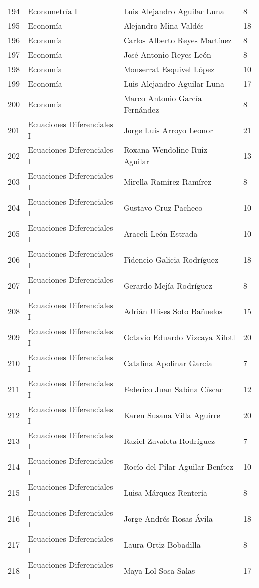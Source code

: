 \begin{table}[ht]
\begin{tabular}{rlll}
  194 & Econometría I & Luis Alejandro Aguilar Luna & 8 \\ 
  195 & Economía & Alejandro Mina Valdés & 18 \\ 
  196 & Economía & Carlos Alberto Reyes Martínez & 8 \\ 
  197 & Economía & José Antonio Reyes León & 8 \\ 
  198 & Economía & Monserrat Esquivel López & 10 \\ 
  199 & Economía & Luis Alejandro Aguilar Luna & 17 \\ 
  200 & Economía & Marco Antonio García Fernández & 8 \\ 
  201 & Ecuaciones Diferenciales I & Jorge Luis Arroyo Leonor & 21 \\ 
  202 & Ecuaciones Diferenciales I & Roxana Wendoline Ruiz Aguilar & 13 \\ 
  203 & Ecuaciones Diferenciales I & Mirella Ramírez Ramírez & 8 \\ 
  204 & Ecuaciones Diferenciales I & Gustavo Cruz Pacheco & 10 \\ 
  205 & Ecuaciones Diferenciales I & Araceli León Estrada & 10 \\ 
  206 & Ecuaciones Diferenciales I & Fidencio Galicia Rodríguez & 18 \\ 
  207 & Ecuaciones Diferenciales I & Gerardo Mejía Rodríguez & 8 \\ 
  208 & Ecuaciones Diferenciales I & Adrián Ulises Soto Bañuelos & 15 \\ 
  209 & Ecuaciones Diferenciales I & Octavio Eduardo Vizcaya Xilotl & 20 \\ 
  210 & Ecuaciones Diferenciales I & Catalina Apolinar García & 7 \\ 
  211 & Ecuaciones Diferenciales I & Federico Juan Sabina Císcar & 12 \\ 
  212 & Ecuaciones Diferenciales I & Karen Susana Villa Aguirre & 20 \\ 
  213 & Ecuaciones Diferenciales I & Raziel Zavaleta Rodríguez & 7 \\ 
  214 & Ecuaciones Diferenciales I & Rocío del Pilar Aguilar Benítez & 10 \\ 
  215 & Ecuaciones Diferenciales I & Luisa Márquez Rentería & 8 \\ 
  216 & Ecuaciones Diferenciales I & Jorge Andrés Rosas Ávila & 18 \\ 
  217 & Ecuaciones Diferenciales I & Laura Ortiz Bobadilla & 8 \\ 
  218 & Ecuaciones Diferenciales I & Maya Lol Sosa Salas & 17 \\ 

\end{tabular}
\end{table}
